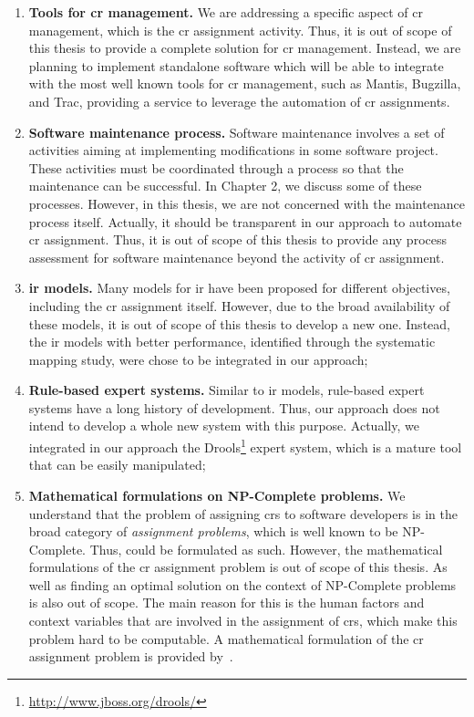 \begin{enumerate}
  \item \textbf{Tools for \ac{cr} management.} We are addressing
  a specific aspect of \ac{cr} management, which is the \ac{cr} assignment
  activity. Thus, it is out of scope of this thesis to provide a
  complete solution for \ac{cr} management. Instead, we are planning to
  implement standalone software which will be able to integrate with the
  most well known tools for \ac{cr} management, such as Mantis, Bugzilla, and
  Trac, providing a service to leverage the automation of \ac{cr}
  assignments.

  \item \textbf{Software maintenance process.} Software maintenance involves
  a set of activities aiming at implementing modifications in some software
  project. These activities must be coordinated through a process so that the
  maintenance can be successful. In Chapter 2, we discuss some of
  these processes. However, in this thesis, we are not concerned with the
  maintenance process itself. Actually, it should be transparent in our approach
  to automate \ac{cr} assignment. Thus, it is out of scope of this
  thesis to provide any process assessment for software maintenance beyond the
  activity of \ac{cr} assignment.

  \item \textbf{\ac{ir} models.} Many models for \ac{ir} have been proposed for
  different objectives, including the \ac{cr} assignment itself. However, due to
  the broad availability of these models, it is out of scope of this thesis to
  develop a new one. Instead, the \ac{ir} models with better performance,
  identified through the systematic mapping study, were chose to be
  integrated in our approach;

  \item \textbf{Rule-based expert systems.} Similar to \ac{ir} models,
  rule-based expert systems have a long history of development. Thus, our
  approach does not intend to develop a whole new system with this purpose.
  Actually, we integrated in our approach the
  Drools\footnote{\url{http://www.jboss.org/drools/}} expert system, which is a
  mature tool that can be easily manipulated;

  \item \textbf{Mathematical formulations on NP-Complete problems.} We
  understand that the problem of assigning \acp{cr} to software developers is in
  the broad category of \emph{assignment problems}, which is well known to be
  NP-Complete. Thus, could be formulated as such. However, the mathematical
  formulations of the \ac{cr} assignment problem is out of scope of this thesis.
  As well as finding an optimal solution on the context of NP-Complete problems
  is also out of scope. The main reason for this is the human factors and
  context variables that are involved in the assignment of \acp{cr}, which
  make this problem hard to be computable. A mathematical formulation of the
  \ac{cr} assignment problem is provided by~\citet{Rahman2009}.
\end{enumerate}


